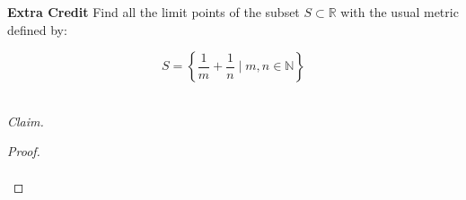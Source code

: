\textbf{Extra Credit} Find all the limit points of the subset $S \subset \mathbb{R}$ with the usual metric defined by:

\begin{equation*}
   S = \left\{ \frac{1}{m} + \frac{1}{n} \; \Bigg| \; m,n \in \mathbb{N} \right\}
\end{equation*}

\ \\

\emph{Claim.} \ \\

\begin{proof}\renewcommand{\qedsymbol}{}\ \\\\
\end{proof}

